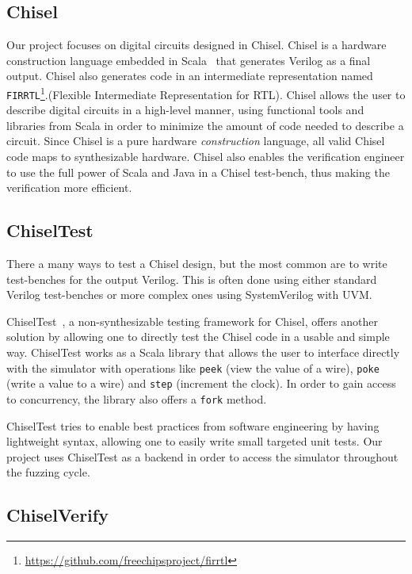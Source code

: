 \documentclass[conference]{IEEEtran}
\begin{document}
\subsection{Chisel}
Our project focuses on digital circuits designed in Chisel.
Chisel is a hardware construction language embedded in Scala~\cite{chisel:dac2012} that generates Verilog as a final output.
Chisel also generates code in an intermediate representation named \texttt{FIRRTL}\footnote{\url{https://github.com/freechipsproject/firrtl}}.(Flexible Intermediate Representation for RTL).
Chisel allows the user to describe digital circuits in a high-level manner, using functional tools and libraries from Scala in order to minimize the amount of code needed to describe a circuit.
Since Chisel is a pure hardware \emph{construction} language, all valid Chisel code maps to synthesizable hardware.
Chisel also enables the verification engineer to use the full power of Scala and Java in a Chisel test-bench, thus making the verification more efficient.

\subsection{ChiselTest}
 
 There a many ways to test a Chisel design, but the most common are to write test-benches for the output Verilog.
 This is often done using either standard Verilog test-benches or more complex ones using SystemVerilog with UVM.
 
ChiselTest~\cite{chisel:tester2}, a non-synthesizable testing framework for Chisel, offers another solution by allowing one to directly test the Chisel code in a usable and simple way.
ChiselTest works as a Scala library that allows the user to interface directly with the simulator with operations like \texttt{peek} (view the value of a wire), \texttt{poke} (write a value to a wire) and \texttt{step} (increment the clock).
In order to gain access to concurrency, the library also offers a \texttt{fork} method.

ChiselTest tries to enable best practices from software engineering by having lightweight syntax, allowing one to easily write small targeted unit tests.
Our project uses ChiselTest as a backend in order to access the simulator throughout the fuzzing cycle.

\subsection{ChiselVerify}
\end{document}
